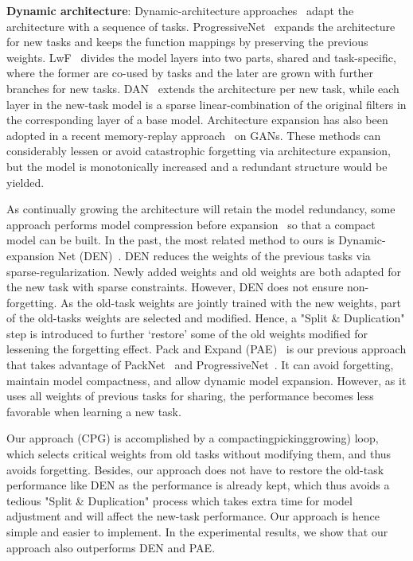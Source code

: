 \documentclass{article}
\begin{document}
\noindent\textbf{Dynamic architecture}:
Dynamic-architecture approaches~\cite{rusu2016progressive, Li_tpami18, Rosenfeld2018IncrementalLT, 19NeurIPSWorkshop_Parisi, yoon2018lifelong} adapt the architecture with a sequence of tasks.
ProgressiveNet~\cite{rusu2016progressive} expands the architecture for new tasks and keeps the function mappings by preserving the previous weights.
LwF~\cite{Li_tpami18} divides the model layers into two parts, shared and task-specific, where the former are co-used by tasks and the later are grown with further branches for new tasks.
DAN~\cite{Rosenfeld2018IncrementalLT} extends the architecture per new task, while each layer in the new-task model is a sparse linear-combination of the original filters in the corresponding layer of a base model.
Architecture expansion has also been adopted in a recent memory-replay approach~\cite{ostapenko2019learning} on GANs.
These methods can considerably lessen or avoid catastrophic forgetting via architecture expansion, but the model is monotonically increased and a redundant structure would be yielded.

As continually growing the architecture will retain the model redundancy, some approach performs model compression before expansion~\cite{yoon2018lifelong} so that a compact model can be built.
In the past, the most related method to ours is Dynamic-expansion Net (DEN)~\cite{yoon2018lifelong}.
DEN reduces the weights of the previous tasks via sparse-regularization. 
Newly added weights and old weights are both adapted for the new task with sparse constraints.
However, DEN does not ensure non-forgetting.
As the old-task weights are jointly trained with the new weights, part of the old-tasks weights are selected and modified. Hence, a "Split \& Duplication" step is introduced to further `restore' some of the old weights modified for lessening the forgetting effect.
Pack and Expand (PAE)~\cite{hung2019increasingly} is our previous approach that takes advantage of PackNet~\cite{mallya2018packnet} and ProgressiveNet~\cite{rusu2016progressive}.
It can avoid forgetting, maintain model compactness, and allow dynamic model expansion.
However, as it uses all weights of previous tasks for sharing, the performance becomes less favorable when learning a new task.

Our approach (CPG) is accomplished by a compactingpickinggrowing) loop, which selects critical weights from old tasks without modifying them, and thus avoids forgetting.
Besides, our approach does not have to restore the old-task performance like DEN as the performance is already kept, which thus avoids a tedious "Split \& Duplication" process which takes extra time for model adjustment and will affect the new-task performance.
Our approach is hence simple and easier to implement.
In the experimental results, we show that our approach also outperforms DEN and PAE. 
\end{document}

